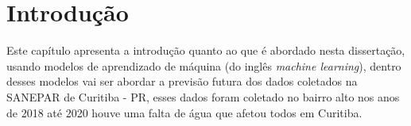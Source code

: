 

\section{Introdu{\c c}{\~a}o} \label{sec:int}

Este capítulo apresenta a introdução quanto ao que é abordado nesta dissertação, usando modelos de aprendizado de máquina (do inglês \textit{machine learning}), dentro desses modelos vai ser abordar a previsão futura dos dados coletados na SANEPAR de Curitiba - PR, esses dados foram coletado no bairro alto nos anos de 2018 até 2020 houve uma falta de água que afetou todos em Curitiba.




    
          
    
    
    
    
    
    
    
    